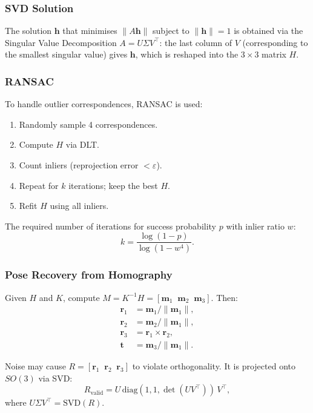 \documentclass[12pt, a4paper]{article}
\begin{document}
\subsubsection{SVD Solution}

The solution $\mathbf{h}$ that minimises $\|A\mathbf{h}\|$ subject to $\|\mathbf{h}\|=1$ is obtained via the Singular Value Decomposition $A = U\Sigma V^\top$: the last column of $V$ (corresponding to the smallest singular value) gives $\mathbf{h}$, which is reshaped into the $3\times3$ matrix $H$.

\subsubsection{RANSAC}

To handle outlier correspondences, RANSAC is used:
\begin{enumerate}
  \item Randomly sample 4 correspondences.
  \item Compute $H$ via DLT.
  \item Count inliers (reprojection error $<\varepsilon$).
  \item Repeat for $k$ iterations; keep the best $H$.
  \item Refit $H$ using all inliers.
\end{enumerate}

The required number of iterations for success probability $p$ with inlier ratio $w$:
\begin{equation}
  k = \frac{\log(1-p)}{\log(1-w^4)}.
\end{equation}

\subsubsection{Pose Recovery from Homography}

Given $H$ and $K$, compute $M = K^{-1}H = [\mathbf{m}_1\;\;\mathbf{m}_2\;\;\mathbf{m}_3]$. Then:
\begin{align}
  \mathbf{r}_1 &= \mathbf{m}_1 / \|\mathbf{m}_1\|, \label{eq:r1}\\
  \mathbf{r}_2 &= \mathbf{m}_2 / \|\mathbf{m}_1\|, \label{eq:r2}\\
  \mathbf{r}_3 &= \mathbf{r}_1 \times \mathbf{r}_2, \label{eq:r3}\\
  \mathbf{t} &= \mathbf{m}_3 / \|\mathbf{m}_1\|. \label{eq:t_recover}
\end{align}

Noise may cause $R = [\mathbf{r}_1\;\;\mathbf{r}_2\;\;\mathbf{r}_3]$ to violate orthogonality. It is projected onto $SO(3)$ via SVD:
\begin{equation}
  R_{\text{valid}} = U\,\mathrm{diag}(1, 1, \det(UV^\top))\,V^\top,
\end{equation}
where $U\Sigma V^\top = \mathrm{SVD}(R)$.
\end{document}
